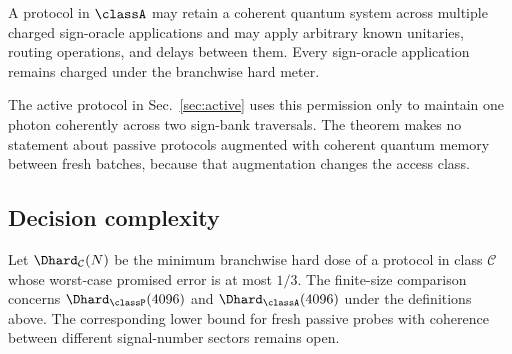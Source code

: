 \begin{definition}
A protocol in $\classA$ may retain a coherent quantum system across multiple charged sign-oracle applications and may apply arbitrary known unitaries, routing operations, and delays between them. Every sign-oracle application remains charged under the branchwise hard meter.
\end{definition}

The active protocol in Sec.~\ref{sec:active} uses this permission only to maintain one photon coherently across two sign-bank traversals. The theorem makes no statement about passive protocols augmented with coherent quantum memory between fresh batches, because that augmentation changes the access class.

\subsection{Decision complexity}

Let $\Dhard_{\mathcal C}(N)$ be the minimum branchwise hard dose of a protocol in class $\mathcal C$ whose worst-case promised error is at most $1/3$. The finite-size comparison concerns $\Dhard_{\classP}(4096)$ and $\Dhard_{\classA}(4096)$ under the definitions above. The corresponding lower bound for fresh passive probes with coherence between different signal-number sectors remains open.

